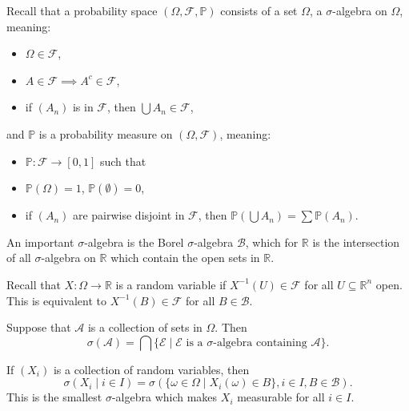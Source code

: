 \documentclass[12pt]{article}
\begin{document}
Recall that a probability space $(\Omega, \mathcal{F}, \mathbb{P})$ consists of a set $\Omega$, a $\sigma$-algebra on $\Omega$, meaning:
\begin{itemize}
	\item $\Omega \in \mathcal{F}$,
	\item $A \in \mathcal{F} \implies A^{c} \in \mathcal{F}$,
	\item if $(A_n)$ is in $\mathcal{F}$, then $\bigcup A_n \in \mathcal{F}$,
\end{itemize}
and $\mathbb{P}$ is a probability measure on $(\Omega, \mathcal{F})$, meaning:
\begin{itemize}
	\item $\mathbb{P} : \mathcal{F} \to [0, 1]$ such that
	\item $\mathbb{P}(\Omega) = 1$, $\mathbb{P}(\emptyset) = 0$,
	\item if $(A_n)$ are pairwise disjoint in $\mathcal{F}$, then $\mathbb{P}(\bigcup A_n) = \sum \mathbb{P}(A_n)$.
\end{itemize}
An important $\sigma$-algebra is the Borel $\sigma$-algebra $\mathcal{B}$, which for $\mathbb{R}$ is the intersection of all $\sigma$-algebra on $\mathbb{R}$ which contain the open sets in $\mathbb{R}$.

Recall that $X : \Omega \to \mathbb{R}$ is a random variable if $X^{-1}(U) \in \mathcal{F}$ for all $U \subseteq \mathbb{R}^n$ open. This is equivalent to $X^{-1}(B) \in \mathcal{F}$ for all $B \in \mathcal{B}$.

\begin{definition}
	Suppose that $\mathcal{A}$ is a collection of sets in $\Omega$. Then
	\[
		\sigma(\mathcal{A}) = \bigcap \{ \mathcal{E} \mid \mathcal{E} \text{ is a $\sigma$-algebra containing } \mathcal{A}\}.
	\]
\end{definition}

If $(X_i)$ is a collection of random variables, then
\[
	\sigma(X_i \mid i \in I) = \sigma(\{ \omega \in \Omega \mid X_i(\omega) \in B\}, i \in I, B \in \mathcal{B}).
\]
This is the smallest $\sigma$-algebra which makes $X_i$ measurable for all $i \in I$.
\end{document}
